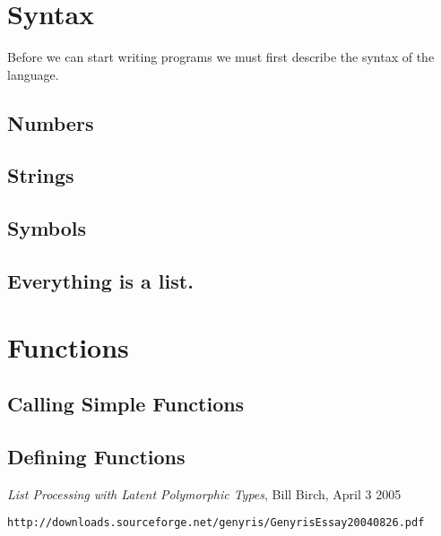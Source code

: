\documentclass[a4paper,12pt,dvips]{article}
\begin{document}
\section{Syntax}
Before we can start writing programs we must first describe the syntax of the language. 
\subsection{Numbers}
\subsection{Strings}
\subsection{Symbols}
\subsection{Everything is a list.}
\section{Functions}
\subsection{Calling Simple Functions}
\subsection{Defining Functions}

\begin{thebibliography}{99}
\emph{List Processing with Latent Polymorphic Types}, Bill Birch, April 3 2005 \begin{verbatim}http://downloads.sourceforge.net/genyris/GenyrisEssay20040826.pdf\end{verbatim}
\end{thebibliography}
\end{document}
